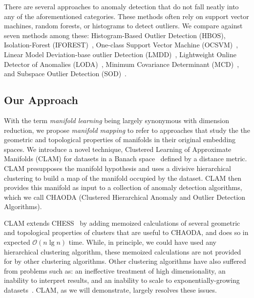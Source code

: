 There are several approaches to anomaly detection that do not fall neatly into any of the aforementioned categories.
These methods often rely on support vector machines, random forests, or histograms to detect outliers.
We compare against seven methods among these:
Histogram-Based Outlier Detection (HBOS)\cite{goldstein2012histogram},
Isolation-Forest (IFOREST)~\cite{tony2008iforest,tony2012iforest},
One-class Support Vector Machine (OCSVM)~\cite{sholkopf2001ocsvm},
Linear Model Deviation-base outlier Detection (LMDD)~\cite{arning1996linear},
Lightweight Online Detector of Anomalies (LODA)~\cite{pevny2016loda},
Minimum Covariance Determinant (MCD)~\cite{rousseeuw1999mcd,hardin2004mcd}, and
Subspace Outlier Detection (SOD)~\cite{kriegel2009sod}.


\subsection{Our Approach}
\label{subsec:introduction:chaoda}

With the term \emph{manifold learning} being largely synonymous with dimension reduction, we propose \emph{manifold mapping} to refer to approaches that study the the geometric and topological properties of manifolds in their original embedding spaces.
We introduce a novel technique, Clustered Learning of Approximate Manifolds (CLAM) for datasets in a Banach space~\cite{banach1929fonctionnelles} defined by a distance metric.
CLAM presupposes the manifold hypothesis and uses a divisive hierarchical clustering to build a map of the manifold occupied by the dataset.
CLAM then provides this manifold as input to a collection of anomaly detection algorithms, which we call CHAODA (Clustered Hierarchical Anomaly and Outlier Detection Algorithms).

CLAM extends CHESS~\cite{ishaq2019clustered} by adding memoized calculations of several geometric and topological properties of clusters that are useful to CHAODA, and does so in expected $\mathcal{O}(n \lg n)$ time.
While, in principle, we could have used any hierarchical clustering algorithm, these memoized calculations are not provided for by other clustering algorithms.
Other clustering algorithms have also suffered from problems such as:
an ineffective treatment of high dimensionality,
an inability to interpret results, and
an inability to scale to exponentially-growing datasets~\cite{agrawal1998automatic}.
CLAM, as we will demonstrate, largely resolves these issues.

